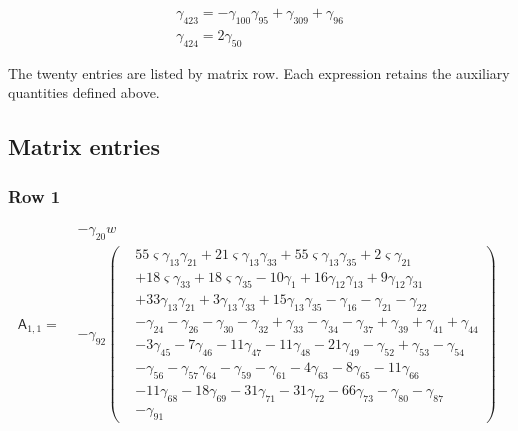 \[\begin{aligned}\gamma_{423}=- \gamma_{100} \gamma_{95} + \gamma_{309} + \gamma_{96}\\ \gamma_{424}=2 \gamma_{50}\end{aligned}\]

\endgroup
The twenty entries are listed by matrix row. Each expression retains
the auxiliary quantities defined above.

\subsection{Matrix entries}
\begingroup\small
\setlength{\abovedisplayskip}{8pt}
\setlength{\belowdisplayskip}{8pt}

\subsubsection*{Row 1}
\[\mathsf A_{1,1}=\begin{aligned}&- \gamma_{20} w\\&- \gamma_{92} \left(\begin{aligned}& 55 \varsigma  \gamma_{13} \gamma_{21}+ 21 \varsigma  \gamma_{13} \gamma_{33}+ 55 \varsigma  \gamma_{13} \gamma_{35}+ 2 \varsigma  \gamma_{21}\\&+ 18 \varsigma  \gamma_{33}+ 18 \varsigma  \gamma_{35}- 10 \gamma_{1}+ 16 \gamma_{12} \gamma_{13}+ 9 \gamma_{12} \gamma_{31}\\&+ 33 \gamma_{13} \gamma_{21}+ 3 \gamma_{13} \gamma_{33}+ 15 \gamma_{13} \gamma_{35}- \gamma_{16}- \gamma_{21}- \gamma_{22}\\&- \gamma_{24}- \gamma_{26}- \gamma_{30}- \gamma_{32}+ \gamma_{33}- \gamma_{34}- \gamma_{37}+ \gamma_{39}+ \gamma_{41}+ \gamma_{44}\\&- 3 \gamma_{45}- 7 \gamma_{46}- 11 \gamma_{47}- 11 \gamma_{48}- 21 \gamma_{49}- \gamma_{52}+ \gamma_{53}- \gamma_{54}\\&- \gamma_{56}- \gamma_{57} \gamma_{64}- \gamma_{59}- \gamma_{61}- 4 \gamma_{63}- 8 \gamma_{65}- 11 \gamma_{66}\\&- 11 \gamma_{68}- 18 \gamma_{69}- 31 \gamma_{71}- 31 \gamma_{72}- 66 \gamma_{73}- \gamma_{80}- \gamma_{87}\\&- \gamma_{91}\end{aligned}\right)\end{aligned}\]

